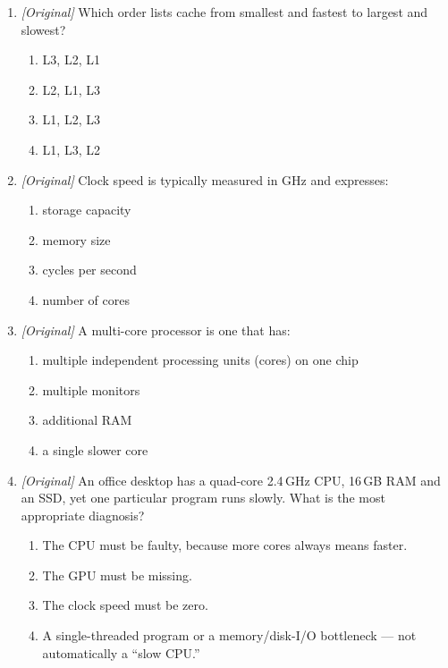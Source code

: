 \documentclass[11pt]{article}
\begin{document}
\begin{enumerate}[label=\textbf{Q\arabic*.}, leftmargin=*]
\begin{enumerate}[label=\Alph*.]
    \item the smallest and fastest level, closest to the core
    \item stored on the hard disk
    \item the same as main memory
  \end{enumerate}
\item \textit{[Original]} Which order lists cache from smallest and fastest to
  largest and slowest?
  \begin{enumerate}[label=\Alph*.]
    \item L3, L2, L1
    \item L2, L1, L3
    \item L1, L2, L3
    \item L1, L3, L2
  \end{enumerate}
\item \textit{[Original]} Clock speed is typically measured in GHz and
  expresses:
  \begin{enumerate}[label=\Alph*.]
    \item storage capacity
    \item memory size
    \item cycles per second
    \item number of cores
  \end{enumerate}
\item \textit{[Original]} A multi-core processor is one that has:
  \begin{enumerate}[label=\Alph*.]
    \item multiple independent processing units (cores) on one chip
    \item multiple monitors
    \item additional RAM
    \item a single slower core
  \end{enumerate}
\item \textit{[Original]} An office desktop has a quad-core 2.4\,GHz CPU,
  16\,GB RAM and an SSD, yet one particular program runs slowly. What is the
  most appropriate diagnosis?
  \begin{enumerate}[label=\Alph*.]
    \item The CPU must be faulty, because more cores always means faster.
    \item The GPU must be missing.
    \item The clock speed must be zero.
    \item A single-threaded program or a memory/disk-I/O bottleneck --- not
      automatically a ``slow CPU.''

\end{enumerate}
\end{enumerate}
\end{document}
